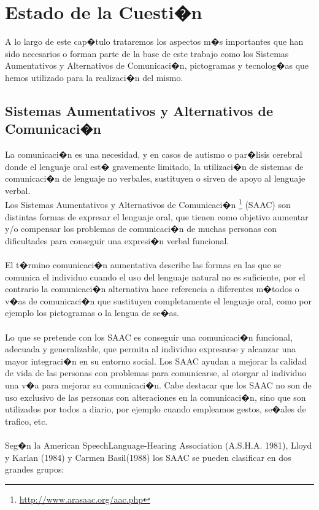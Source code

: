 
\chapter{Estado de la Cuesti�n}
\label{cap:estadoDeLaCuestion}


\begin{resumen}
	A lo largo de este cap�tulo trataremos los aspectos m�s importantes que han sido necesarios o forman parte de la base de este trabajo como los Sistemas Aumentativos y Alternativos de Comunicaci�n, pictogramas y tecnolog�as que hemos utilizado para la realizaci�n del mismo.

\end{resumen}

\section{Sistemas Aumentativos y Alternativos de Comunicaci�n}
\label{cap2:sec:Sistemas Aumentativos y Alternativos de Comunicaci�n}


La comunicaci�n es una necesidad, y en casos de autismo o par�lisis cerebral donde el lenguaje oral est� gravemente limitado, la utilizaci�n de sistemas de comunicaci�n de lenguaje no verbales, sustituyen o sirven de apoyo al lenguaje verbal. \\
Los Sistemas Aumentativos y Alternativos de Comunicaci�n \footnote{\url{http://www.arasaac.org/aac.php}} (SAAC) son distintas formas de expresar el lenguaje oral, que tienen como objetivo aumentar y/o compensar los problemas de comunicaci�n de muchas personas con dificultades para conseguir una expresi�n verbal funcional.
\\ \\
El t�rmino comunicaci�n aumentativa describe las formas en las que se comunica el individuo cuando el uso del lenguaje natural no es suficiente, por el contrario la comunicaci�n alternativa hace referencia a diferentes m�todos o v�as de comunicaci�n que sustituyen completamente el lenguaje oral, como por ejemplo los pictogramas o la lengua de se�as.
\\ \\

Lo que se pretende con los SAAC es conseguir una comunicaci�n funcional, adecuada y generalizable, que permita al individuo expresarse y alcanzar una mayor integraci�n en su entorno social. Los SAAC ayudan a mejorar la calidad de vida de las personas con problemas para comunicarse, al otorgar al individuo una v�a para mejorar su comunicaci�n.
Cabe destacar que los SAAC no son de uso exclusivo de las personas con alteraciones en la comunicaci�n, sino que son utilizados por todos a diario, por ejemplo cuando empleamos gestos, se�ales de trafico, etc.
\\ \\
Seg�n la American SpeechLanguage-Hearing Association (A.S.H.A. 1981),  Lloyd y Karlan (1984) y Carmen Basil(1988) los SAAC se pueden clasificar en dos grandes grupos:

